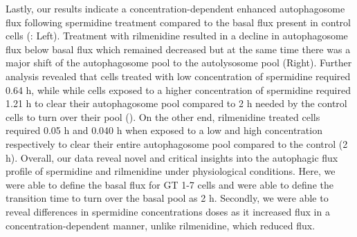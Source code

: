 Lastly, our results indicate a concentration-dependent enhanced autophagosome flux following spermidine treatment compared to the basal flux present in control cells (: Left). Treatment with rilmenidine resulted in a decline in autophagosome flux below basal flux which remained decreased but at the same time there was a major shift of the autophagosome pool to the autolysosome pool  (Right). Further analysis revealed that cells treated with low concentration of spermidine required 0.64 h, while while cells exposed to a higher concentration of spermidine required 1.21 h to clear their autophagosome pool compared to 2 h needed by the control cells to turn over their pool (). On the other end, rilmenidine treated cells required 0.05 h and 0.040 h when exposed to a low and high concentration respectively to clear their entire autophagosome pool compared to the control (2 h). Overall, our data reveal novel and critical insights into the autophagic flux profile of spermidine and rilmenidine under physiological conditions. Here, we were able to define the basal flux for GT 1-7 cells and were able to define the transition time to turn over the basal pool as 2 h. Secondly, we were able to reveal differences in spermidine concentrations doses as it increased flux in a concentration-dependent manner, unlike rilmenidine, which reduced flux.

